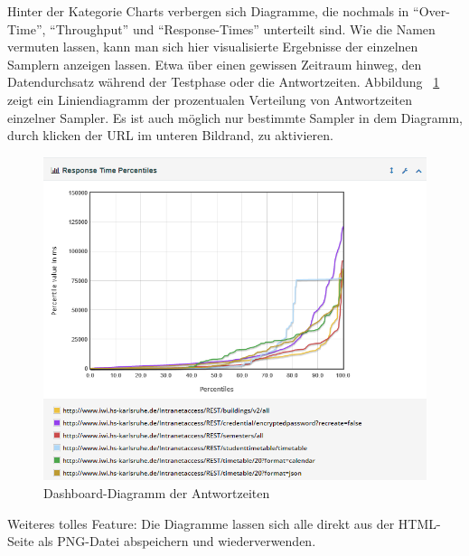 \documentclass[a4paper,12pt]{article}
\begin{document}
Hinter der Kategorie Charts verbergen sich Diagramme, die nochmals in "`Over-Time"', "`Throughput"' und "`Response-Times"' unterteilt sind. Wie die Namen vermuten lassen, kann man sich hier visualisierte Ergebnisse der einzelnen Samplern anzeigen lassen. Etwa über einen gewissen Zeitraum hinweg, den Datendurchsatz während der Testphase oder die Antwortzeiten. Abbildung ~\ref{fig:response_time_dashboard} zeigt ein Liniendiagramm der prozentualen Verteilung von Antwortzeiten einzelner Sampler. Es ist auch möglich nur bestimmte Sampler in dem Diagramm, durch klicken der URL im unteren Bildrand, zu aktivieren.

\begin{figure}[htb]%
 \centering
    \includegraphics[width=1\textwidth]{bilder/response_time_dashboard.png}
  \caption{Dashboard-Diagramm der Antwortzeiten}
  \label{fig:response_time_dashboard}
\end{figure}

Weiteres tolles Feature: Die Diagramme lassen sich alle direkt aus der HTML-Seite als PNG-Datei abspeichern und wiederverwenden.
\end{document}
